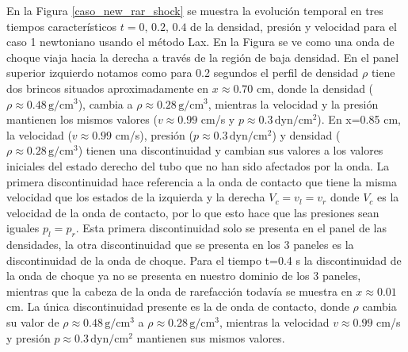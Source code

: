 \documentclass[12pt,a4paper]{book}
\begin{document}
En la Figura \ref{caso_new_rar_shock} se muestra la evolución temporal en tres 
tiempos característicos $t = 0, \, 0.2, \, 0.4$
de la densidad, 
presión y velocidad para el caso 1 newtoniano usando el método Lax. En la Figura se ve como 
una onda de choque viaja hacia la derecha a través de la región de baja densidad.
En el panel superior izquierdo
notamos como para 0.2 segundos el perfil de densidad $\rho$ tiene dos brincos situados 
aproximadamente en 
$x \approx 0.70$ cm, donde la densidad ($\rho \approx 0.48 \,  \text{g}/ \text{cm}^3$), 
cambia a $\rho \approx 0.28 \,  \text{g}/ \text{cm}^3$, mientras la velocidad y la presión 
mantienen los mismos valores 
($v \approx 0.99$ cm/s y $p \approx 0.3 \,  \text{dyn}/ \text{cm}^2 $).
En x=0.85 cm, la velocidad ($v \approx 0.99$ cm/s), presión 
($p \approx 0.3  \,  \text{dyn}/ \text{cm}^2 $)  y  densidad 
($\rho \approx 0.28 \,  \text{g}/ \text{cm}^3$) 
tienen una discontinuidad y cambian sus valores a los valores iniciales del estado derecho del tubo
que no han sido afectados por la onda. 
La primera discontinuidad hace referencia a la onda de contacto que tiene la misma velocidad
que los estados de la izquierda y la derecha $V_c = v_l = v_r$ donde $V_c$
es la velocidad de la onda de contacto, por lo que esto hace que las presiones sean iguales 
$p_l = p_r$. Esta primera discontinuidad solo se 
presenta en el panel de las densidades, la otra discontinuidad que se presenta en los 3 paneles es la 
discontinuidad de la onda de choque.
Para el tiempo t=0.4 s
la discontinuidad de la onda de choque ya no se presenta en nuestro dominio de los 3 paneles, mientras 
que la cabeza de la onda de rarefacción todavía se muestra en $x \approx 0.01$ cm. La única discontinuidad 
presente es la de onda de 
contacto, donde $\rho$ cambia su valor de $\rho \approx 0.48 \,  \text{g}/ \text{cm}^3$
a $\rho \approx 0.28 \,  \text{g}/ \text{cm}^3$, mientras la velocidad $v \approx 0.99$ cm/s y 
presión $p \approx 0.3 \,  \text{dyn}/ \text{cm}^2 $ mantienen
sus mismos valores.
\end{document}
